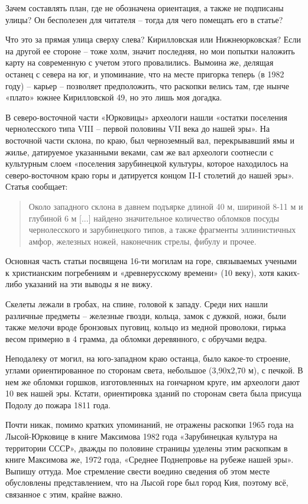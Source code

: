 Зачем составлять план, где не обозначена  ориентация, а также не подписаны улицы? Он бесполезен для читателя – тогда для чего помещать его в статье?

Что это за прямая улица сверху слева? Кирилловская или Нижнеюрковская? Если на другой ее стороне – тоже холм, значит последняя, но мои попытки наложить карту на современную с учетом этого провалились. Вымоина же, делящая останец с севера на юг, и упоминание, что на месте пригорка теперь (в 1982 году) – карьер – позволяет предположить, что раскопки велись там, где нынче «плато» южнее Кирилловской 49, но это лишь моя догадка.

В северо-восточной части «Юрковицы» археологи нашли «остатки поселения чернолесского типа VIII – первой половины VII века до нашей эры». На восточной части склона, по краю, был черноземный вал, перекрывавший ямы и жилье, датируемое указанными веками, сам же вал археологи соотнесли с культурным слоем «поселения зарубинецкой культуры, которое находилось на северо-восточном краю горы и датируется концом II-I столетий до нашей эры». Статья сообщает:

\begin{quotation}
Около западного склона в давнем подъярке длиной 40 м, шириной 8-11 м и глубиной 6 м [...] найдено значительное количество обломков посуды чернолесского и зарубинецкого типов, а также фрагменты эллинистичных амфор, железных ножей, наконечник стрелы, фибулу и прочее.
\end{quotation}

Основная часть статьи посвящена 16-ти могилам на горе, связываемых учеными к христианским погребениям и «древнерусскому времени» (10 веку), хотя каких-либо указаний на эти выводы я не вижу.

Скелеты лежали в гробах, на спине, головой к западу. Среди них нашли различные предметы – железные гвозди, кольца, замок с дужкой, ножи, были также мелочи вроде бронзовых пуговиц, кольцо из медной проволоки, гирька весом примерно в 4 грамма, да обломки деревянного, с обручами ведра. 

Неподалеку от могил, на юго-западном краю останца, было какое-то строение, углами ориентированное по сторонам света, небольшое (3,90х2,70 м), с печкой. В нем же обломки горшков, изготовленных на гончарном круге, им археологи дают 10 век нашей эры. Кстати, ориентировка зданий по сторонам света была присуща Подолу до пожара 1811 года.

Почти никак, помимо кратких упоминаний, не отражены раскопки 1965 года на Лысой-Юрковице в книге Максимова 1982 года «Зарубинецкая культура на территории СССР», дважды по половине страницы уделены этим раскопкам в книге Максимова же, 1972 года, «Среднее Поднепровье на рубеже нашей эры». Выпишу оттуда. Мое стремление свести воедино сведения об этом месте обусловлены представлением, что на Лысой горе был город Кия, поэтому всё, связанное с этим, крайне важно.

